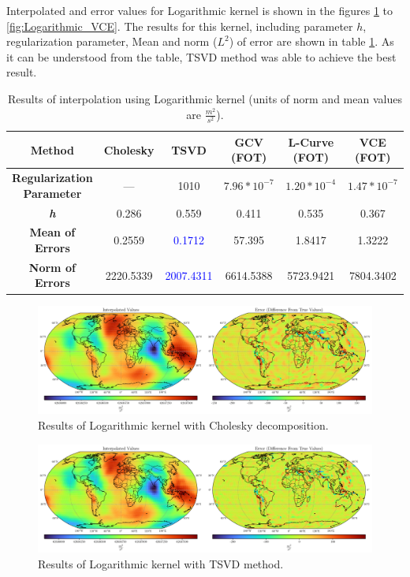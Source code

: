 \documentclass[12pt]{article}
\begin{document}
	Interpolated and error values for Logarithmic kernel is shown in the figures \ref{fig:Logarithmic_Chol} to \ref{fig:Logarithmic_VCE}. The results for this kernel, including parameter $h$, regularization parameter, Mean and norm ($L^2$) of error are shown in table \ref{tab:Logarithmic_Results}. As it can be understood from the table, TSVD method was able to achieve the best result.
	
	\begin{table}[h!]
		\centering
		\caption{Results of interpolation using Logarithmic kernel (units of norm and mean values are $\frac{m^2}{s^2}$).}
		\vspace{0.2cm}
		\renewcommand{\arraystretch}{2}
		\begin{tabular}{c|c|c|c|c|c}
			\textbf{Method} & Cholesky & TSVD & GCV (FOT) & L-Curve (FOT) & VCE (FOT) \\
			\hline 
			\makecell{\textbf{Regularization} \\ \textbf{Parameter}} & --- & 1010 & $7.96*10^{-7}$ & $1.20*10^{-4}$ & $1.47*10^{-7}$ \\
			\hline 
			\textit{\textbf{h}} & 0.286 & 0.559 & 0.411 & 0.535 & 0.367 \\
			\hline
			\textbf{Mean of Errors} & 0.2559 & \textcolor{blue}{0.1712} & 57.395 & 1.8417 & 1.3222 \\
			\hline 
			\textbf{Norm of Errors} & 2220.5339 & \textcolor{blue}{2007.4311} & 6614.5388 & 5723.9421 & 7804.3402 \\
		\end{tabular}
		\label{tab:Logarithmic_Results}
	\end{table}
	
	\begin{figure}[h!]
		\centering
		\includegraphics[width=16cm]{../Outputs/Plots/Plot_Logarithmic_Cholesky.pdf}
		\caption{Results of Logarithmic kernel with Cholesky decomposition.}
		\label{fig:Logarithmic_Chol}
	\end{figure}
	
	\begin{figure}[h!]
		\centering
		\includegraphics[width=16cm]{../Outputs/Plots/Plot_Logarithmic_TSVD.pdf}
		\caption{Results of Logarithmic kernel with TSVD method.}
		\label{fig:Logarithmic_TSVD}
	\end{figure}
	
\end{document}

